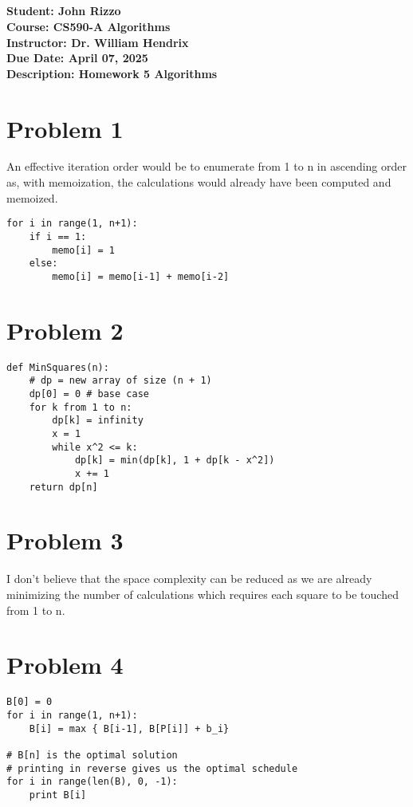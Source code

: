 \documentclass[12pt, letterpaper]{article}
\title{\classname \\ \assignmentdescription}
\author{\studentname}
\date{\duedate}
\newcommand{\studentname}          {John Rizzo           }
\newcommand{\classname}            {CS590-A Algorithms   }
\newcommand{\professorname}        {Dr. William Hendrix  }
\newcommand{\assignmentdescription}{Homework 5 Algorithms}
\newcommand{\duedate}              {April 07, 2025     }
\begin{document}
\noindent
\normalsize \textbf{Student:     \studentname} \\ [5pt]
            \textbf{Course:      \classname} \\ [5pt]
            \textbf{Instructor:  \professorname} \\ [5pt]
            \textbf{Due Date:    \duedate} \\ [5pt]
            \textbf{Description: \assignmentdescription}

\vspace{0.5cm}

\section*{Problem 1}

An effective iteration order would be to enumerate from 1 to n in ascending order as, with memoization, the calculations would already have been computed and memoized.

\begin{verbatim}
for i in range(1, n+1):
    if i == 1:
        memo[i] = 1
    else:
        memo[i] = memo[i-1] + memo[i-2]
\end{verbatim}

\section*{Problem 2}

\begin{verbatim}
def MinSquares(n):
    # dp = new array of size (n + 1)
    dp[0] = 0 # base case
    for k from 1 to n:
        dp[k] = infinity
        x = 1
        while x^2 <= k:
            dp[k] = min(dp[k], 1 + dp[k - x^2])
            x += 1
    return dp[n]
\end{verbatim}

\section*{Problem 3}

I don't believe that the space complexity can be reduced as we are already minimizing the number of calculations which requires each square to be touched from 1 to n.

\break
\section*{Problem 4}

\begin{verbatim}
B[0] = 0
for i in range(1, n+1):
    B[i] = max { B[i-1], B[P[i]] + b_i}

# B[n] is the optimal solution
# printing in reverse gives us the optimal schedule
for i in range(len(B), 0, -1):
    print B[i]    
\end{verbatim}
\end{document}
